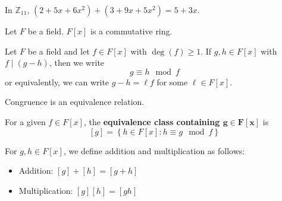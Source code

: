 \begin{exbox}
    \begin{example}
        In $ \mathbb{Z}_{11} $, $ (2+5x+6x^2)+(3+9x+5x^2)=5+3x $.
    \end{example}
\end{exbox}

\begin{thmbox}
    \begin{theorem}
        Let $ F $ be a field. $ F[x] $ is a commutative ring.
    \end{theorem}
\end{thmbox}

\begin{defbox}
    \begin{definition}
        Let $ F $ be a field and let $ f\in F[x] $ with $ \deg(f)\geqslant 1 $.
        If $ g,h\in F[x] $ with $ f\mid (g-h) $, then we write
        \[ g\equiv h \mod f \]
        or equivalently, we can write $ g-h=\ell f $ for some $ \ell\in F[x] $.
    \end{definition}
\end{defbox}

\begin{thmbox}
    \begin{theorem}
        Congruence is an equivalence relation.
    \end{theorem}
\end{thmbox}

\begin{defbox}
    \begin{definition}
        For a given $ f\in F[x] $, the \textbf{equivalence class containing $\bm{g\in F[x]}$}
        is
        \[ [g]=\left\{h\in F[x]: h\equiv g \mod f\right\} \]
    \end{definition}
\end{defbox}

\begin{defbox}
    \begin{definition}
        For $ g,h\in F[x] $, we define addition and multiplication as follows:
        \begin{itemize}
            \item Addition: $ [g]+[h]=[g+h] $
            \item Multiplication: $ [g][h]=[gh] $
        \end{itemize}
    \end{definition}
\end{defbox}

